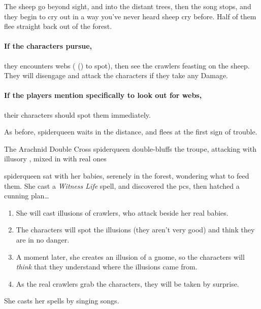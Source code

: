 \begin{boxtext}
  The sheep go beyond sight, and into the distant trees, then the song stops, and they begin to cry out in a way you've never heard sheep cry before.  Half of them flee straight back out of the forest.
\end{boxtext}

\paragraph{If the characters pursue,}
they encounters webs ( (\tn[9]) to spot), then see the \glspl{crawler} feasting on the sheep.
They will disengage and attack the characters if they take any Damage.

\paragraph{If the players mention specifically to look out for webs,}
their characters should spot them immediately.


As before, \gls{spiderqueen} waits in the distance, and flees at the first sign of trouble.

{The Arachnid Double Cross}%
{\Gls{spiderqueen} double-bluffs the troupe, attacking with illusory , mixed in with real ones}%
\label{spiderqueenssong}

\Gls{spiderqueen} sat with her babies, serenely in the forest, wondering what to feed them.
She cast a \textit{Witness Life} spell, and discovered the \glspl{pc}, then hatched a cunning plan\ldots

\begin{enumerate}
  \item
    She will cast illusions of \glspl{crawler}, who attack beside her real babies.
  \item
  The characters will spot the illusions (they aren't very good) and think they are in no danger.
  \item
  A moment later, she creates an illusion of a gnome, so the characters will \emph{think} that they understand where the illusions came from.
  \item
  As the real \glspl{crawler} grab the characters, they will be taken by surprise.
\end{enumerate}

She casts her \glspl{spell} by singing songs.

